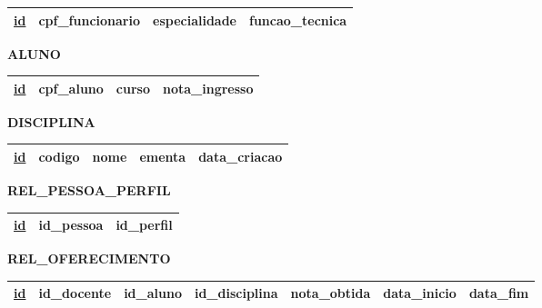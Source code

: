\documentclass{article}
\begin{document}
\begin{table}[H]
  \renewcommand{\arraystretch}{1.5}
  \begin{tabular}{|c|c|c|c|}
    \hline
    \underline{id} &
    cpf\_funcionario &
    especialidade &
    funcao\_tecnica \\
    \hline
  \end{tabular}
\end{table}

\noindent
\textbf{ALUNO}
\vspace{-5pt}

\begin{table}[H]
  \renewcommand{\arraystretch}{1.5}
  \begin{tabular}{|c|c|c|c|}
    \hline
    \underline{id} &
    cpf\_aluno &
    curso &
    nota\_ingresso \\
    \hline
  \end{tabular}
\end{table}

\noindent
\textbf{DISCIPLINA}
\vspace{-5pt}

\begin{table}[H]
  \renewcommand{\arraystretch}{1.5}
  \begin{tabular}{|c|c|c|c|c|}
    \hline
    \underline{id} &
    codigo &
    nome &
    ementa &
    data\_criacao \\
    \hline
  \end{tabular}
\end{table}

\noindent
\textbf{REL\_PESSOA\_PERFIL}
\vspace{-5pt}

\begin{table}[H]
  \renewcommand{\arraystretch}{1.5}
  \begin{tabular}{|c|c|c|}
    \hline
    \underline{id} &
    id\_pessoa &
    id\_perfil \\
    \hline
  \end{tabular}
\end{table}

\noindent
\textbf{REL\_OFERECIMENTO}
\vspace{-5pt}

\begin{table}[H]
  \renewcommand{\arraystretch}{1.5}
  \begin{tabular}{|c|c|c|c|c|c|c|}
    \hline
    \underline{id} &
    id\_docente &
    id\_aluno &
    id\_disciplina &
    nota\_obtida &
    data\_inicio &
    data\_fim \\
    \hline
  \end{tabular}
\end{table}
\end{document}

